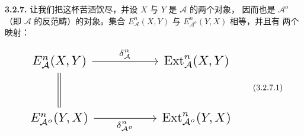 \medskip\noindent\textbf{3.2.7.}\quad
让我们把这杯苦酒饮尽，并设 $X$ 与 $Y$ 是 $\mathcal A$ 的两个对象，
因而也是 $\mathcal A^o$（即 $\mathcal A$ 的反范畴）的对象。集合
$E_{\mathcal A}^{n}(X,Y)$ 与 $E_{\mathcal A^o}^{n}(Y,X)$ 相等，并且有
两个映射：

\begin{equation}
\resizebox{0.74\textwidth}{!}{%
$\begin{tikzcd}[ampersand replacement=\&,column sep=5.0em,row sep=2.8em]
E_{\mathcal A}^{n}(X,Y)
  \arrow[r,"{\delta_{\mathcal A}^{n}}"]
  \arrow[d,equal]
\& \operatorname{Ext}_{\mathcal A}^{n}(X,Y) \\
E_{\mathcal A^o}^{n}(Y,X)
  \arrow[r,"{\delta_{\mathcal A^o}^{n}}"']
\& \operatorname{Ext}_{\mathcal A^o}^{n}(Y,X)
\end{tikzcd}$%
}
\tag{3.2.7.1}
\end{equation}
\endgroup
